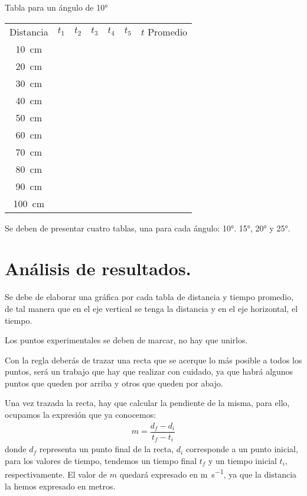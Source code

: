 \documentclass[14pt]{extarticle}
\begin{document}
\begin{table}[H]
\centering
Tabla para un ángulo de \ang{10}

\begin{tabular}{| c | >{\centering}p{1cm} | >{\centering}p{1cm} | >{\centering}p{1cm} | >{\centering}p{1cm} | >{\centering}p{1cm} | c |} \hline
 & \multicolumn{5}{c|}{Tiempos} & \\ \hline
Distancia & $t_{1}$ & $t_{2}$ & $t_{3}$ & $t_{4}$ & $t_{5}$ & $t$ Promedio \\ \hline
\SI{10}{\centi\meter} & & & & & & \\ \hline
\SI{20}{\centi\meter} & & & & & & \\ \hline
\SI{30}{\centi\meter} & & & & & & \\ \hline
\SI{40}{\centi\meter} & & & & & & \\ \hline
\SI{50}{\centi\meter} & & & & & & \\ \hline
\SI{60}{\centi\meter} & & & & & & \\ \hline
\SI{70}{\centi\meter} & & & & & & \\ \hline
\SI{80}{\centi\meter} & & & & & & \\ \hline
\SI{90}{\centi\meter} & & & & & & \\ \hline
\SI{100}{\centi\meter} & & & & & & \\ \hline
\end{tabular}
\end{table}

Se deben de presentar cuatro tablas, una para cada ángulo: \ang{10}. \ang{15}, \ang{20} y \ang{25}.

\section{Análisis de resultados.}

Se debe de elaborar una gráfica por cada tabla de distancia y tiempo promedio, de tal manera que en el eje vertical se tenga la distancia y en el eje horizontal, el tiempo.

Los puntos experimentales se deben de marcar, no hay que unirlos.

Con la regla deberás de trazar una recta que se acerque lo más posible a todos los puntos, será un trabajo que hay que realizar con cuidado, ya que habrá algunos puntos que queden por arriba y otros que queden por abajo.

Una vez trazada la recta, hay que calcular la pendiente de la misma, para ello, ocupamos la expresión que ya conocemos:
\begin{align*}
m = \dfrac{d_{f} - d_{i}}{t_{f} - t_{i}}
\end{align*}
donde $d_{f}$ representa un punto final de la recta, $d_{i}$ corresponde a un punto inicial, para los valores de tiempo, tendemos un tiempo final $t_{f}$ y un tiempo inicial $t_{i}$, respectivamente. El valor de $m$ quedará expresado en \unit{\meter\per\second}, ya que la distancia la hemos expresado en metros.
\end{document}
